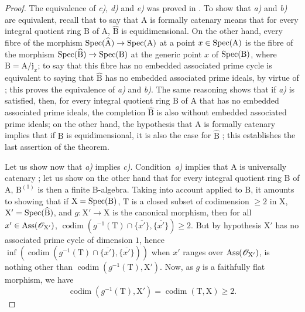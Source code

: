 \begin{proof}
The equivalence of \emph{c)}, \emph{d)} and \emph{e)} was proved in .
To show that \emph{a)} and \emph{b)} are equivalent, recall  that to say that $\mathrm{A}$ is formally catenary means that for every integral quotient ring $\mathrm{B}$ of $\mathrm{A}$, $\widehat{\mathrm{B}}$ is equidimensional.
On the other hand, every fibre of the morphism $\operatorname{Spec}(\widehat{\mathrm{A}})\to\operatorname{Spec}(\mathrm{A})$ at a point $x\in\operatorname{Spec}(\mathrm{A})$ is the fibre of the morphism $\operatorname{Spec}(\widehat{\mathrm{B}})\to\operatorname{Spec}(\mathrm{B})$ at the generic point $x$ of $\operatorname{Spec}(\mathrm{B})$, where $\mathrm{B}=\mathrm{A}/\mathfrak{j}_x$; to say that this fibre has no embedded associated prime cycle is equivalent to saying that $\widehat{\mathrm{B}}$ has no embedded associated prime ideals, by virtue of ; this proves the equivalence of \emph{a)} and \emph{b)}.
The same reasoning shows that if \emph{a)} is satisfied, then, for every integral quotient ring $\mathrm{B}$ of $\mathrm{A}$ that has no embedded associated prime ideals, the completion $\widehat{\mathrm{B}}$ is also without embedded associated prime ideals; on the other hand, the hypothesis that $\mathrm{A}$ is formally catenary implies that if $\mathrm{B}$ is equidimensional, it is also the case for $\widehat{\mathrm{B}}$ ; this establishes the last assertion of the theorem.

Let us show now that \emph{a)} implies \emph{c)}.
Condition~\emph{a)} implies that $\mathrm{A}$ is universally catenary ; let us show on the other hand that for every integral quotient ring $\mathrm{B}$ of $\mathrm{A}$, $\mathrm{B}^{(1)}$ is then a finite B-algebra.
Taking into account  applied to $\mathrm{B}$, it amounts to showing that if $\mathrm{X}=\operatorname{Spec}(\mathrm{B})$, $\mathrm{T}$ is a closed subset of codimension $\geqslant 2$ in $\mathrm{X}$, $\mathrm{X}'=\operatorname{Spec}(\widehat{\mathrm{B}})$, and $g:\mathrm{X}'\to\mathrm{X}$ is the canonical morphism, then for all $x'\in\operatorname{Ass}(\mathscr{O}_{\mathrm{X}'})$, $\operatorname{codim}(g^{-1}(\mathrm{T})\cap\overline{\{x'\}},\overline{\{x'\}})\geqslant 2$.
But by hypothesis $\mathrm{X}'$ has no associated prime cycle of dimension $1$, hence $\inf(\operatorname{codim}(g^{-1}(\mathrm{T})\cap\overline{\{x'\}},\overline{\{x'\}}))$ when $x'$ ranges over $\operatorname{Ass}(\mathscr{O}_{\mathrm{X}'})$, is nothing other than $\operatorname{codim}(g^{-1}(\mathrm{T}),\mathrm{X}')$.
Now, as $g$ is a faithfully flat morphism, we have 
\[
  \operatorname{codim}(g^{-1}(\mathrm{T}),\mathrm{X}')=\operatorname{codim}(\mathrm{T},\mathrm{X})\geqslant 2.
\]


\end{proof}
